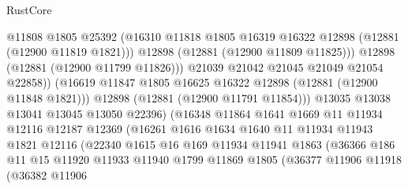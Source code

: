\begin{lexlean}{RustCore}
\begin{coremodule}
                                  @11808
                                  @1805
                                  @25392
                                  (@16310
                                    @11818
                                    @1805
                                    @16319
                                    @16322
                                    @12898
                                    (@12881 (@12900 @11819 @1821)))
                                  @12898
                                  (@12881 (@12900 @11809 @11825)))
                                @12898
                                (@12881 (@12900 @11799 @11826)))
                              @21039
                              @21042
                              @21045
                              @21049
                              @21054
                              @22858))
                          (@16619 @11847 @1805 @16625 @16322 @12898 (@12881 (@12900 @11848 @1821)))
                          @12898
                          (@12881 (@12900 @11791 @11854)))
                        @13035
                        @13038
                        @13041
                        @13045
                        @13050
                        @22396)
                      (@16348
                        @11864
                        @1641
                        @1669
                        @11
                        @11934
                        @12116
                        @12187
                        @12369
                        (@16261
                          @1616
                          @1634
                          @1640
                          @11
                          @11934
                          @11943
                          @1821
                          @12116
                          (@22340
                            @1615
                            @16
                            @169
                            @11934
                            @11941
                            @1863
                            (@36366
                              @186
                              @11
                              @15
                              @11920
                              @11933
                              @11940
                              @1799
                              @11869
                              @1805
                              (@36377
                                @11906
                                @11918
                                (@36382
                                  @11906

\end{coremodule}
\end{lexlean}
